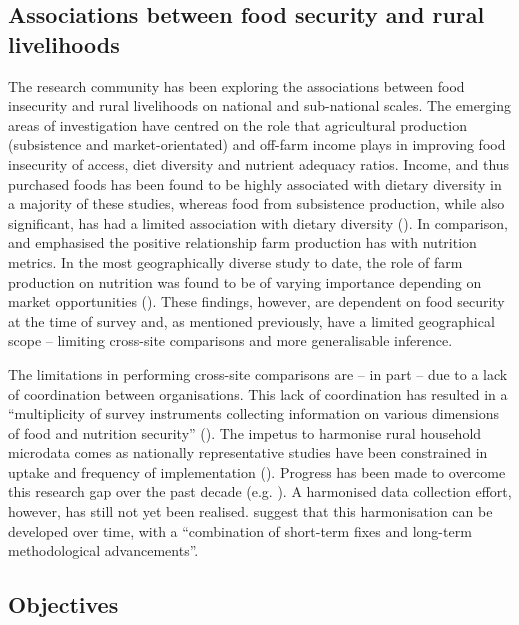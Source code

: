\subsection{Associations between food security and rural livelihoods}
The research community has been exploring the associations between food insecurity and rural livelihoods on national and sub-national scales. The emerging areas of investigation have centred on the role that agricultural production (subsistence and market-orientated) and off-farm income plays in improving food insecurity of access, diet diversity and nutrient adequacy ratios. Income, and thus purchased foods has been found to be highly associated with dietary diversity in a majority of these studies, whereas food from subsistence production, while also significant, has had a limited association with dietary diversity (\citealp{Bellon2016, Koppmair2017325, Luckett20152479, Sibhatu201510657, Snapp2015, Dillon2014}). In comparison, \citet{Jones2016} and \citet{MKaibi2015} emphasised the positive relationship farm production has with nutrition metrics. In the most geographically diverse study to date, the role of farm production on nutrition was found to be of varying importance depending on market opportunities (\citealp{Sibhatu201510657}). These findings, however, are dependent on food security at the time of survey and, as mentioned previously, have a limited geographical scope -- limiting cross-site comparisons and more generalisable inference.

The limitations in performing cross-site comparisons are -- in part -- due to a lack of coordination between organisations. This lack of coordination has resulted in a ``multiplicity of survey instruments collecting information on various dimensions of food and nutrition security'' (\citealp[p.~30]{Carletto2013}). The impetus to harmonise rural household microdata comes as nationally representative studies have been constrained in uptake and frequency of implementation (\citealp{Desiere2018, Carletto2013}). Progress has been made to overcome this research gap over the past decade (e.g. \citealp{Carletto2009, Herrero2007}). A harmonised data collection effort, however, has still not yet been realised. \citet[p.39]{Carletto2013} suggest that this harmonisation can be developed over time, with a ``combination of short-term fixes and long-term methodological advancements''.


\subsection{Objectives}

